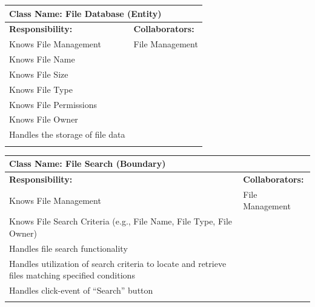 \documentclass[]{article}
\begin{document}
\begin{itemize}
	\begin{table}[ht]
		\centering
		\begin{tabular}{|p{7cm}|p{7cm}|}
		\hline 
		 \multicolumn{2}{|l|}{\textbf{Class Name:} File Database (Entity)} \\
		\hline
		\textbf{Responsibility:} & \textbf{Collaborators:} \\
		\hline
			Knows File Management & File Management \\
			Knows File Name &\\
			Knows File Size &\\
			Knows File Type &\\
			Knows File Permissions &\\
			Knows File Owner &\\
			Handles the storage of file data &\\
		\vspace{0.1in} & \\
		\hline
		\end{tabular}
	\end{table}


	\begin{table}[ht]
		\centering
		\begin{tabular}{|p{7cm}|p{7cm}|}
		\hline 
		 \multicolumn{2}{|l|}{\textbf{Class Name:} File Search (Boundary)} \\
		\hline
		\textbf{Responsibility:} & \textbf{Collaborators:} \\
		\hline
			Knows File Management & File Management\\
			Knows File Search Criteria (e.g., File Name, File Type, File Owner) &\\
			Handles file search functionality &\\
			Handles utilization of search criteria to locate and retrieve files matching specified conditions &\\
			Handles click-event of “Search” button &\\
		\vspace{0.1in} & \\
		\hline
		\end{tabular}
	\end{table}


\end{itemize}
\end{document}
